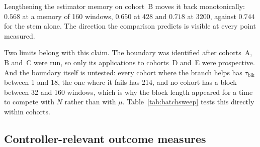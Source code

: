 \documentclass[a4paper,fleqn]{cas-dc}
\begin{document}
Lengthening the estimator memory on cohort~B moves it back monotonically: $0.568$ at a memory of 160 windows, $0.650$ at 428 and $0.718$ at 3200, against $0.744$ for the stem alone. The direction the comparison predicts is visible at every point measured.

Two limits belong with this claim. The boundary was identified after cohorts~A, B and~C were run, so only its applications to cohorts~D and~E were prospective. And the boundary itself is untested: every cohort where the branch helps has $\tau_{\mathrm{blk}}$ between 1 and 18, the one where it fails has 214, and no cohort has a block between 32 and 160 windows, which is why the block length appeared for a time to compete with $N$ rather than with $\mu$. Table~\ref{tab:batchsweep} tests this directly within cohorts.

\begin{table}[t]
\centering
\caption{The estimator memory against the class-block length, varied directly; $p$ is from a two-sided paired Wilcoxon test. $\mu = N/m$ is the memory in windows, set by the number $N$ averaged into one covariance update and the momentum $m$. Controls are matched on $N$, which changes training, while $m$ is inert for a stem that maintains no running statistic.}
\label{tab:batchsweep}
\end{table}

\subsection{Controller-relevant outcome measures}\label{sec:deploy}
\end{document}
